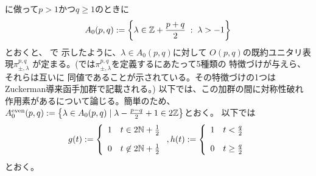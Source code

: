 \documentclass[12pt]{article} %
\newcommand{\nin}{\not\in}
\theoremstyle{definition}
\theoremstyle{exampstyle} \newtheorem{examp}[theorem]{Theorem}
\newcommand{\doubt}[1]{\uwave{#1}}
\begin{document}
\cite[(5.1.1)]{KO2}に做って$p>1${かつ}$q\ge1$のときに\begin{equation*}
	A_0(p,q):=\left\{ \lambda\in\mathbb{Z}+\frac{p+q}{2}\;:\;\lambda>-1 \right\}
\end{equation*}とおくと、
\cite{KO2}で
示したように、$\lambda\in A_0(p,q)$に対して
$O(p,q)$の既約ユニタリ表現$\pi_{\pm,\lambda}^{p,q}$
が定まる。(\cite{KO2}では$\pi_{\pm,\lambda}^{p,q}$を定義するにあたって5種類の
特徴づけが与えら\doubt{れ}、それらは互いに
同値であることが示されている。その特徴づけの1つは
Zuckerman導来函手加群で記載される。)
以下では、この加群の間に対称性破れ作用素がある\doubt{か}について論じる。簡単のため、$A_0^{\mbox{\scriptsize even}}(p,q):=\left\{ \lambda\in A_0(p,q)\mid \lambda-\frac{p-q}{2}+1\in2\mathbb{Z} \right\}$とおく。
以下では\begin{equation*}
	g(t):=\left\{ \begin{array}[]{ll}
		1&t\in2\N+\frac{1}{2}\\[10pt]
		0&t\nin 2\N+\frac{1}{2}
	\end{array}\right.,h(t):=\left\{ \begin{array}[]{ll}
		1&t<\frac{q}{2}\\[10pt]
		0&t\ge\frac{q}{2}
\end{array}\right.
\end{equation*}とおく。
\end{document}
